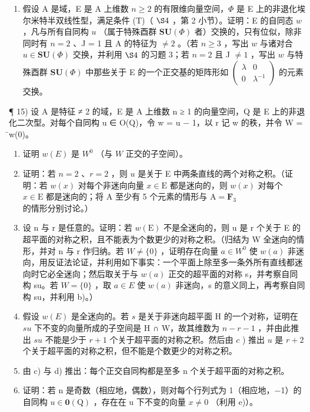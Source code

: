 \begin{enumerate}
\def\labelenumi{\arabic{enumi})}
\setcounter{enumi}{13}
\tightlist
\item
  假设 A 是域，E 是 A 上维数 \(n \geqslant 2\) 的有限维向量空间，\(\Phi\) 是 E 上的非退化埃尔米特半双线性型，满足条件 (T)（ \(\S 4\) ，第 2 小节）。证明：E 的自同态 \(w\) ，凡与所有自同构 \(u\) （属于特殊酉群 \(\mathbf{SU}(\Phi)\) 者）交换的，只有位似，除非同时有 \(n = 2\) 、J = 1 且 A 的特征为 \(\neq 2\) 。（若 \(n \geqslant 3\) ，写出 \(w\) 与诸对合 \(u \in \mathbf{SU}(\Phi)\) 交换，并利用 \(\S 4\) 的习题 3；若 \(n = 2\) 且 J \(\neq 1\) ，写出 \(w\) 与特殊酉群 \(\mathbf{SU}(\Phi)\) 中那些关于 E 的一个正交基的矩阵形如 \(\begin{pmatrix} \lambda & 0 \\ 0 & \lambda^{-1} \end{pmatrix}\) 的元素交换。
\end{enumerate}

¶ 15) 设 A 是特征 ≠ 2 的域，E 是 A 上维数 n ≥ 1 的向量空间，Q 是 E 上的非退化二次型。对每个自同构 u ∈ O(Q)，令 w = u − 1，以 r 记 w 的秩，并令 W = ̄w(0)。

\begin{enumerate}
\def\labelenumi{\alph{enumi})}
\item
  证明 \(w(E)\) 是 \(W^{0}\) （与 \(W\) 正交的子空间）。
\item
  证明：若 \(n=2\) 、\(r=2\) ，则 \(u\) 是关于 E 中两条直线的两个对称之积。（证明：若 \(w(x)\) 对每个非迷向向量 \(x\in\mathrm{E}\) 都是迷向的，则 \(w(x)\) 对每个 \(x\in\mathrm{E}\) 都是迷向的；将 A 至少有 5 个元素的情形与 \(\mathrm{A}=\mathbf{F}_{3}\) 的情形分别讨论。）
\item
  设 n 与 r 是任意的。证明：若 \(w(\mathrm{E})\) 不是全迷向的，则 u 是 r 个关于 E 的超平面的对称之积，且不能表为个数更少的对称之积。（归结为 W 全迷向的情形，并对 n 与 r 作归纳。若 \(W \neq \{0\}\) ，证明存在向量 \(a \in W^{0}\) 使 \(w(a)\) 非迷向，用反证法论证，并利用如下事实：一个平面上除至多一条外所有直线都迷向时它必全迷向；然后取关于与 \(w(a)\) 正交的超平面的对称 s，并考察自同构 su。若 \(W = \{0\}\) ，取 \(a \in E\) 使 \(w(a)\) 非迷向，s 的意义同上，再考察自同构 su，并利用 b)。）
\item
  假设 \(w(E)\) 是全迷向的。若 \(s\) 是关于非迷向超平面 H 的一个对称，证明在 \(su\) 下不变的向量所成的子空间是 H ∩ W，故其维数为 \(n-r-1\) ，并由此推出 \(su\) 不能是少于 \(r+1\) 个关于超平面的对称之积。然后由 \(c\) ) 推出 \(u\) 是 \(r+2\) 个关于超平面的对称之积，但不能是个数更少的对称之积。
\item
  由 c) 与 d) 推出：每个正交自同构都是至多 n 个关于超平面的对称之积。
\item
  证明：若 n 是奇数（相应地，偶数），则对每个行列式为 1（相应地，−1）的自同构 \(u \in \mathbf{0}(\mathrm{Q})\) ，存在在 u 下不变的向量 \(x \neq 0\) （利用 e)）。
\end{enumerate}

